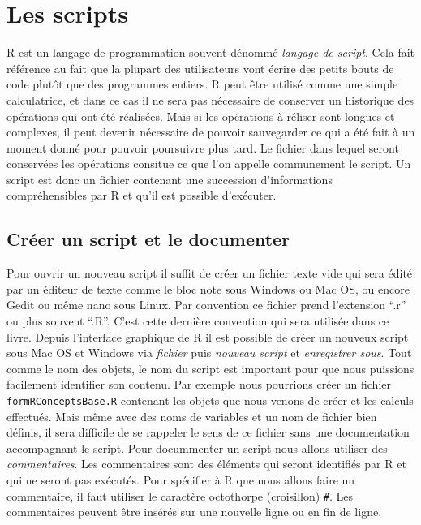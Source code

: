 \documentclass[]{book}
\begin{document}
\hypertarget{les-scripts}{%
\section{Les scripts}\label{les-scripts}}

R est un langage de programmation souvent dénommé \emph{langage de script}. Cela fait référence au fait que la plupart des utilisateurs vont écrire des petits bouts de code plutôt que des programmes entiers. R peut être utilisé comme une simple calculatrice, et dans ce cas il ne sera pas nécessaire de conserver un historique des opérations qui ont été réalisées. Mais si les opérations à réliser sont longues et complexes, il peut devenir nécessaire de pouvoir sauvegarder ce qui a été fait à un moment donné pour pouvoir poursuivre plus tard. Le fichier dans lequel seront conservées les opérations consitue ce que l'on appelle communement le script. Un script est donc un fichier contenant une succession d'informations compréhensibles par R et qu'il est possible d'exécuter.

\hypertarget{creer-un-script-et-le-documenter}{%
\subsection{Créer un script et le documenter}\label{creer-un-script-et-le-documenter}}

Pour ouvrir un nouveau script il suffit de créer un fichier texte vide qui sera édité par un éditeur de texte comme le bloc note sous Windows ou Mac OS, ou encore Gedit ou même nano sous Linux. Par convention ce fichier prend l'extension ``.r'' ou plus souvent ``.R''. C'est cette dernière convention qui sera utilisée dans ce livre. Depuis l'interface graphique de R il est possible de créer un nouveux script sous Mac OS et Windows via \emph{fichier} puis \emph{nouveau script} et \emph{enregistrer sous}.
Tout comme le nom des objets, le nom du script est important pour que nous puissions facilement identifier son contenu. Par exemple nous pourrions créer un fichier \texttt{formRConceptsBase.R} contenant les objets que nous venons de créer et les calculs effectués. Mais même avec des noms de variables et un nom de fichier bien définis, il sera difficile de se rappeler le sens de ce fichier sans une documentation accompagnant le script. Pour docummenter un script nous allons utiliser des \emph{commentaires}. Les commentaires sont des éléments qui seront identifiés par R et qui ne seront pas exécutés. Pour spécifier à R que nous allons faire un commentaire, il faut utiliser le caractère octothorpe (croisillon) \texttt{\#}. Les commentaires peuvent être insérés sur une nouvelle ligne ou en fin de ligne.
\end{document}
